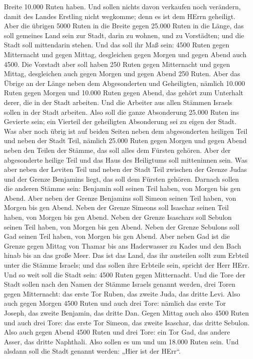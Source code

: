 Breite 10.000 Ruten haben.  Und sollen nichts davon
verkaufen noch verändern, damit des Landes Erstling nicht wegkomme; denn
es ist dem HErrn geheiligt.  Aber die übrigen 5000 Ruten in
die Breite gegen 25.000 Ruten in die Länge, das soll gemeines Land sein
zur Stadt, darin zu wohnen, und zu Vorstädten; und die Stadt soll
mittendarin stehen.  Und das soll ihr Maß sein: 4500 Ruten
gegen Mitternacht und gegen Mittag, desgleichen gegen Morgen und gegen
Abend auch 4500.  Die Vorstadt aber soll haben 250 Ruten
gegen Mitternacht und gegen Mittag, desgleichen auch gegen Morgen und
gegen Abend 250 Ruten.  Aber das Übrige an der Länge neben
dem Abgesonderten und Geheiligten, nämlich 10.000 Ruten gegen Morgen und
10.000 Ruten gegen Abend, das gehört zum Unterhalt derer, die in der
Stadt arbeiten.  Und die Arbeiter aus allen Stämmen Israels
sollen in der Stadt arbeiten.  Also soll die ganze
Absonderung 25.000 Ruten ins Gevierte sein; ein Vierteil der geheiligten
Absonderung sei zu eigen der Stadt.  Was aber noch übrig
ist auf beiden Seiten neben dem abgesonderten heiligen Teil und neben
der Stadt Teil, nämlich 25.000 Ruten gegen Morgen und gegen Abend neben
den Teilen der Stämme, das soll alles dem Fürsten gehören. Aber der
abgesonderte heilige Teil und das Haus des Heiligtums soll mitteninnen
sein.  Was aber neben der Leviten Teil und neben der Stadt
Teil zwischen der Grenze Judas und der Grenze Benjamins liegt, das soll
dem Fürsten gehören.  Darnach sollen die anderen Stämme
sein: Benjamin soll seinen Teil haben, von Morgen bis gen Abend.
 Aber neben der Grenze Benjamins soll Simeon seinen Teil
haben, von Morgen bis gen Abend.  Neben der Grenze Simeons
soll Isaschar seinen Teil haben, von Morgen bis gen Abend. 
Neben der Grenze Isaschars soll Sebulon seinen Teil haben, von Morgen
bis gen Abend.  Neben der Grenze Sebulons soll Gad seinen
Teil haben, von Morgen bis gen Abend.  Aber neben Gad ist
die Grenze gegen Mittag von Thamar bis ans Haderwasser zu Kades und den
Bach hinab bis an das große Meer.  Das ist das Land, das
ihr austeilen sollt zum Erbteil unter die Stämme Israels; und das sollen
ihre Erbteile sein, spricht der Herr HErr.  Und so weit
soll die Stadt sein: 4500 Ruten gegen Mitternacht.  Und die
Tore der Stadt sollen nach den Namen der Stämme Israels genannt werden,
drei Toren gegen Mitternacht: das erste Tor Ruben, das zweite Juda, das
dritte Levi.  Also auch gegen Morgen 4500 Ruten und auch
drei Tore: nämlich das erste Tor Joseph, das zweite Benjamin, das dritte
Dan.  Gegen Mittag auch also 4500 Ruten und auch drei Tore:
das erste Tor Simeon, das zweite Isaschar, das dritte Sebulon.
 Also auch gegen Abend 4500 Ruten und drei Tore: ein Tor
Gad, das andere Asser, das dritte Naphthali.  Also sollen
es um und um 18.000 Ruten sein. Und alsdann soll die Stadt genannt
werden: „Hier ist der HErr``.
